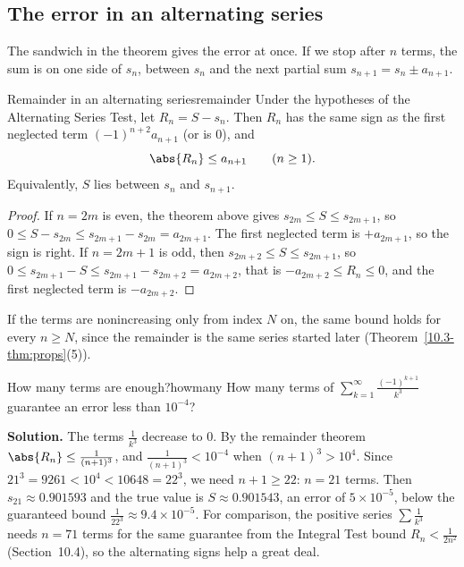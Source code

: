 \documentclass[11pt]{article}
\begin{document}
\subsection*{The error in an alternating series}

The sandwich in the theorem gives the error at once. If we stop after $n$ terms, the sum is on one side of $s_n$, between $s_n$ and the next partial sum $s_{n+1}=s_n\pm a_{n+1}$.

\begin{thm}{Remainder in an alternating series}{remainder}
Under the hypotheses of the Alternating Series Test, let $R_n=S-s_n$. Then $R_n$ has the same sign as the first neglected term $(-1)^{n+2}a_{n+1}$ (or is $0$), and
\[
\abs{R_n}\le a_{n+1}\qquad(n\ge1).
\]
Equivalently, $S$ lies between $s_n$ and $s_{n+1}$.
\end{thm}
\begin{proof}
If $n=2m$ is even, the theorem above gives $s_{2m}\le S\le s_{2m+1}$, so $0\le S-s_{2m}\le s_{2m+1}-s_{2m}=a_{2m+1}$. The first neglected term is $+a_{2m+1}$, so the sign is right. If $n=2m+1$ is odd, then $s_{2m+2}\le S\le s_{2m+1}$, so $0\le s_{2m+1}-S\le s_{2m+1}-s_{2m+2}=a_{2m+2}$, that is $-a_{2m+2}\le R_n\le0$, and the first neglected term is $-a_{2m+2}$.
\end{proof}

If the terms are nonincreasing only from index $N$ on, the same bound holds for every $n\ge N$, since the remainder is the same series started later (Theorem~\ref{10.3-thm:props}(5)).

\begin{exmp}{How many terms are enough?}{howmany}
How many terms of $\displaystyle\sum_{k=1}^\infty\frac{(-1)^{k+1}}{k^3}$ guarantee an error less than $10^{-4}$?

\textbf{Solution.} The terms $\frac1{k^3}$ decrease to $0$. By the remainder theorem $\abs{R_n}\le\frac1{(n+1)^3}$, and $\frac1{(n+1)^3}<10^{-4}$ when $(n+1)^3>10^4$. Since $21^3=9261<10^4<10648=22^3$, we need $n+1\ge22$: $n=21$ terms. Then $s_{21}\approx0.901593$ and the true value is $S\approx0.901543$, an error of $5\times10^{-5}$, below the guaranteed bound $\frac1{22^3}\approx9.4\times10^{-5}$. For comparison, the positive series $\sum\frac1{k^3}$ needs $n=71$ terms for the same guarantee from the Integral Test bound $R_n<\frac1{2n^2}$ (Section~10.4), so the alternating signs help a great deal.
\end{exmp}
\end{document}
